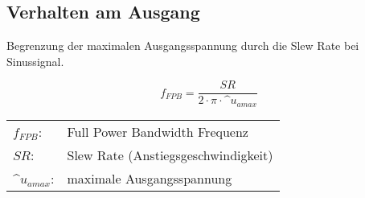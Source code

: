 




\subsection{Verhalten am Ausgang}

Begrenzung der maximalen Ausgangsspannung durch die Slew Rate bei Sinussignal.

\[ f_{FPB} = \frac{SR}{2 \cdot \pi \cdot \^{u}_{a max} } \]

\begin{tabular}{@{}ll}

  $f_{FPB}$:	          & Full Power Bandwidth Frequenz \\
  $SR$:                   & Slew Rate (Anstiegsgeschwindigkeit) \\   
  $\^{u}_{a max}$:        & maximale Ausgangsspannung \\
                
\end{tabular}
